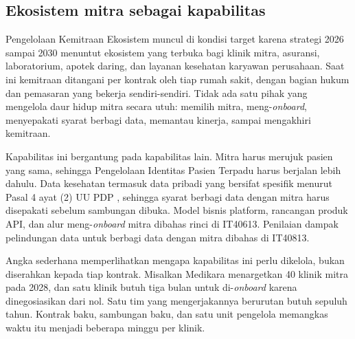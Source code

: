\subsection*{Ekosistem mitra sebagai kapabilitas}

Pengelolaan Kemitraan Ekosistem muncul di kondisi target karena strategi 2026 sampai 2030
menuntut ekosistem yang terbuka bagi klinik mitra, asuransi, laboratorium, apotek daring,
dan layanan kesehatan karyawan perusahaan. Saat ini kemitraan ditangani per kontrak oleh
tiap rumah sakit, dengan bagian hukum dan pemasaran yang bekerja sendiri-sendiri. Tidak ada
satu pihak yang mengelola daur hidup mitra secara utuh: memilih mitra, meng-\textit{onboard},
menyepakati syarat berbagi data, memantau kinerja, sampai mengakhiri kemitraan.

Kapabilitas ini bergantung pada kapabilitas lain. Mitra harus merujuk pasien yang sama,
sehingga Pengelolaan Identitas Pasien Terpadu harus berjalan lebih dahulu. Data kesehatan
termasuk data pribadi yang bersifat spesifik menurut Pasal 4 ayat (2) UU PDP
\cite{uu27-2022-pdp}, sehingga syarat berbagi data dengan mitra harus disepakati sebelum
sambungan dibuka. Model bisnis platform, rancangan produk API, dan alur
meng-\textit{onboard} mitra dibahas rinci di IT40613. Penilaian dampak pelindungan data
untuk berbagi data dengan mitra dibahas di IT40813.

Angka sederhana memperlihatkan mengapa kapabilitas ini perlu dikelola, bukan diserahkan
kepada tiap kontrak. Misalkan Medikara menargetkan 40 klinik mitra pada 2028, dan satu
klinik butuh tiga bulan untuk di-\textit{onboard} karena dinegosiasikan dari nol. Satu tim
yang mengerjakannya berurutan butuh sepuluh tahun. Kontrak baku, sambungan baku, dan satu
unit pengelola memangkas waktu itu menjadi beberapa minggu per klinik.

